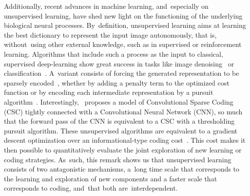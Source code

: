 \documentclass[vision,article,accept,oneauthor,pdftex]{Definitions/mdpi}
\begin{document}
Additionally, recent advances in machine learning, and~especially on unsupervised learning, have shed new light on the functioning of the underlying biological neural processes. By~definition, unsupervised learning aims at learning the best dictionary to represent the input image autonomously, that is, without~using other external knowledge, such as in supervised or reinforcement learning. Algorithms that include such a process as the input to classical, supervised deep-learning show great success in tasks like image denoising~\citep{Vincent08} or {classification}~\citep{Sulam2017multi,PerrinetBednar15}. A~variant consists of forcing the generated representation to be sparsely encoded~\citep{MakhzaniF13}, whether by adding a penalty term to the optimized cost function or by encoding each intermediate representation by a pursuit algorithm~\citep{Papyan16}. Interestingly,~\citep{Papyan16} proposes a model of Convolutional Sparse Coding (CSC) tightly connected with a Convolutional Neural Network (CNN), so much that the forward pass of the CNN is equivalent to a CSC with a thresholding pursuit algorithm. These unsupervised algorithms are equivalent to a gradient descent optimization over an informational-type coding cost~\citep{Kingma13}. This cost makes it then possible to quantitatively evaluate the joint exploration of new learning or coding strategies. As~such, this remark shows us that unsupervised learning consists of two antagonistic mechanisms, a~long time scale that corresponds to the learning and exploration of new components and a faster scale that corresponds to coding, and~that both are~interdependent.
\end{document}
